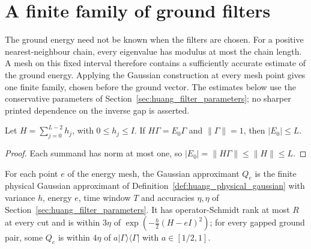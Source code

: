 \section{A finite family of ground filters}
\label{sec:huang_filter_family}

The ground energy need not be known when the filters are chosen. For a
positive nearest-neighbour chain, every eigenvalue has modulus at most the
chain length. A mesh on this fixed interval therefore contains a sufficiently
accurate estimate of the ground energy. Applying the Gaussian construction at
every mesh point gives one finite family, chosen before the ground vector.
The estimates below use the conservative parameters of
Section~\ref{sec:huang_filter_parameters}; no sharper printed dependence on
the inverse gap is asserted.

\begin{lemma}
    \label{lem:huang_positive_chain_energy_window}
    \leanok
    Let $H=\sum_{j=0}^{L-2}h_j$, with $0\le h_j\le I$. If
    $H\Gamma=E_0\Gamma$ and $\|\Gamma\|=1$, then $|E_0|\le L$.
\end{lemma}
\begin{proof}
    \leanok
    Each summand has norm at most one, so
    $|E_0|=\|H\Gamma\|\le\|H\|\le L$.
\end{proof}

\begin{definition}
    \label{def:huang_filter_approximant}
    \leanok
    For each point $e$ of the energy mesh, the Gaussian approximant $Q_e$ is
    the finite physical Gaussian approximant of
    Definition~\ref{def:huang_physical_gaussian} with variance $h$, energy
    $e$, time window $T$ and accuracies $\eta,\eta$ of
    Section~\ref{sec:huang_filter_parameters}. It has operator-Schmidt rank
    at most $R$ at every cut and is within $3\eta$ of
    $\exp(-\tfrac h2(H-eI)^2)$; for every gapped ground pair, some $Q_e$ is
    within $4\eta$ of $a|\Gamma\rangle\langle\Gamma|$ with $a\in[1/2,1]$.
\end{definition}

